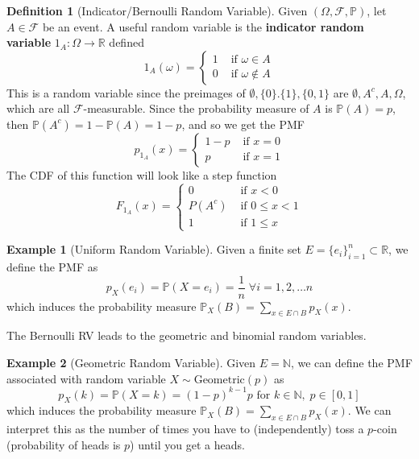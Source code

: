 \documentclass{article}
\theoremstyle{definition}
\newtheorem{example}{Example}[section]
\theoremstyle{remark}
\theoremstyle{definition}
\newtheorem{definition}{Definition}[section]
\begin{document}
\begin{definition}[Indicator/Bernoulli Random Variable]
Given $(\Omega, \mathcal{F}, \mathbb{P})$, let $A \in \mathcal{F}$ be an event. A useful random variable is the \textbf{indicator random variable} $1_A: \Omega \longrightarrow \mathbb{R}$ defined  
\[1_A (\omega) = \begin{cases} 1 & \text{ if } \omega \in A \\ 0 & \text{ if } \omega \not\in A \end{cases}\]
This is a random variable since the preimages of $\emptyset, \{0\}. \{1\}, \{0, 1\}$ are $\emptyset, A^c, A, \Omega$, which are all $\mathcal{F}$-measurable. Since the probability measure of $A$ is $\mathbb{P}(A) = p$, then $\mathbb{P}(A^c) = 1 - \mathbb{P}(A) = 1 - p$, and so we get the PMF 
\[p_{1_A} (x) = \begin{cases} 1 - p & \text{ if } x = 0 \\ p & \text{ if } x = 1 \end{cases}\]
The CDF of this function will look like a step function 
\[F_{1_A} (x) = \begin{cases} 0 & \text{ if } x < 0  \\ P(A^c) & \text{ if } 0 \leq x < 1 \\ 1 & \text{ if } 1 \leq x \end{cases}\]
\end{definition}

\begin{example}[Uniform Random Variable]
Given a finite set $E = \{e_i\}_{i=1}^n \subset \mathbb{R}$, we define the PMF as 
\[p_X (e_i) = \mathbb{P}(X = e_i) = \frac{1}{n} \; \forall i = 1, 2, \ldots n\]
which induces the probability measure $\mathbb{P}_X (B) = \sum_{x \in E \cap B} p_X (x)$. 
\end{example}

The Bernoulli RV leads to the geometric and binomial random variables. 

\begin{example}[Geometric Random Variable]
Given $E = \mathbb{N}$, we can define the PMF associated with random variable $X \sim \mathrm{Geometric}(p)$ as 
\[p_X (k) =\mathbb{P}(X = k) = (1 - p)^{k-1} p \text{ for } k \in \mathbb{N}, \; p \in [0, 1]\]
which induces the probability measure $\mathbb{P}_X (B) = \sum_{x \in E \cap B} p_X (x)$. We can interpret this as the number of times you have to (independently) toss a $p$-coin (probability of heads is $p$) until you get a heads. 
\end{example}
\end{document}
